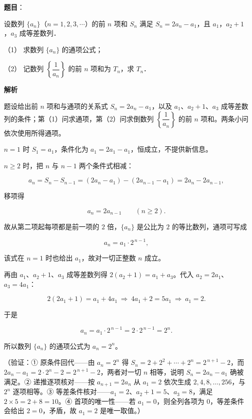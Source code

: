 \begin{answer}

\textbf{题目}：

设数列 \(\{a_n\}\)（\(n=1,2,3,\cdots\)）的前 \(n\) 项和 \(S_n\) 满足 \(S_n=2a_n-a_1\)，且 \(a_1\)，\(a_2+1\)，\(a_3\) 成等差数列．

（1） 求数列 \(\{a_n\}\) 的通项公式；

（2） 记数列 \(\left\{\dfrac{1}{a_n}\right\}\) 的前 \(n\) 项和为 \(T_n\)，求 \(T_n\)．

\textbf{解析}

题设给出前 \(n\) 项和与通项的关系式 \(S_n=2a_n-a_1\)，以及 \(a_1\)、\(a_2+1\)、\(a_3\) 成等差数列的条件；第（1）问求通项，第（2）问求倒数列 \(\left\{\dfrac{1}{a_n}\right\}\) 的前 \(n\) 项和。两条小问依次使用所得通项。


\(n=1\) 时 \(S_1=a_1\)，条件化为 \(a_1=2a_1-a_1\)，恒成立，不提供新信息。

\(n\geqslant2\) 时，把 \(n\) 与 \(n-1\) 两个条件式相减：

\nopagebreak[4]
\[
a_n=S_n-S_{n-1}=(2a_n-a_1)-(2a_{n-1}-a_1)=2a_n-2a_{n-1},
\]

移项得

\nopagebreak[4]
\[
a_n=2a_{n-1}\qquad(n\geqslant2).
\]

故从第二项起每项都是前一项的 \(2\) 倍，\(\{a_n\}\) 是公比为 \(2\) 的等比数列，通项可写成

\nopagebreak[4]
\[
a_n=a_1\cdot2^{\,n-1},
\]

该式在 \(n=1\) 时也给出 \(a_1\)，故对一切正整数 \(n\) 成立。

再由 \(a_1\)、\(a_2+1\)、\(a_3\) 成等差数列得 \(2(a_2+1)=a_1+a_3\)。代入 \(a_2=2a_1\)、\(a_3=4a_1\)：

\nopagebreak[4]
\[
2(2a_1+1)=a_1+4a_1\ \Longrightarrow\ 4a_1+2=5a_1\ \Longrightarrow\ a_1=2.
\]

于是

\nopagebreak[4]
\[
a_n=a_1\cdot2^{\,n-1}=2\cdot2^{\,n-1}=2^{n}.
\]

所以数列 \(\{a_n\}\) 的通项公式为 \(a_n=2^{n}\)。

（验证：① 原条件回代——由 \(a_n=2^{n}\) 得 \(S_n=2+2^{2}+\cdots+2^{n}=2^{\,n+1}-2\)，而 \(2a_n-a_1=2\cdot2^{n}-2=2^{\,n+1}-2\)，两者对一切 \(n\) 相等，说明 \(S_n=2a_n-a_1\) 确被满足。② 递推逐项核对——按 \(a_{n+1}=2a_n\) 从 \(a_1=2\) 依次生成 \(2,4,8,\dots,256\)，与 \(2^{n}\) 逐项相等。③ 等差条件核对——\(a_1=2\)、\(a_2+1=5\)、\(a_3=8\)，满足 \(2\times5=2+8=10\)。④ 首项的唯一性——若 \(a_1=0\)，则全列各项为 \(0\)，等差条件会给出 \(2=0\)，矛盾，故 \(a_1=2\) 是唯一取值。）


\end{answer}
